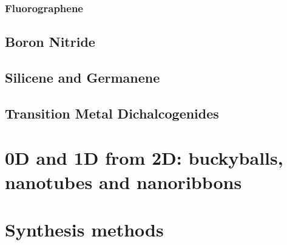 \subsubsection{Fluorographene}
\subsection{Boron Nitride}
\subsection{Silicene and Germanene}
\subsection{Transition Metal Dichalcogenides}
\section{0D and 1D from 2D: buckyballs, nanotubes and nanoribbons}
\section{Synthesis methods}
